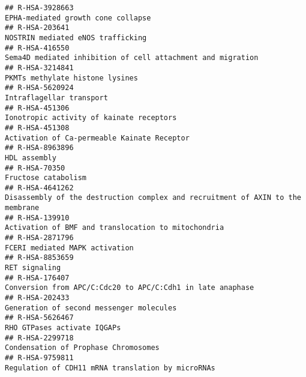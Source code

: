 \documentclass[
]{article}
\begin{document}
\begin{verbatim}
## R-HSA-3928663                                                                                                   EPHA-mediated growth cone collapse
## R-HSA-203641                                                                                                     NOSTRIN mediated eNOS trafficking
## R-HSA-416550                                                                           Sema4D mediated inhibition of cell attachment and migration
## R-HSA-3214841                                                                                                      PKMTs methylate histone lysines
## R-HSA-5620924                                                                                                             Intraflagellar transport
## R-HSA-451306                                                                                              Ionotropic activity of kainate receptors
## R-HSA-451308                                                                                           Activation of Ca-permeable Kainate Receptor
## R-HSA-8963896                                                                                                                         HDL assembly
## R-HSA-70350                                                                                                                    Fructose catabolism
## R-HSA-4641262                                                       Disassembly of the destruction complex and recruitment of AXIN to the membrane
## R-HSA-139910                                                                                   Activation of BMF and translocation to mitochondria
## R-HSA-2871796                                                                                                       FCERI mediated MAPK activation
## R-HSA-8853659                                                                                                                        RET signaling
## R-HSA-176407                                                                            Conversion from APC/C:Cdc20 to APC/C:Cdh1 in late anaphase
## R-HSA-202433                                                                                              Generation of second messenger molecules
## R-HSA-5626467                                                                                                          RHO GTPases activate IQGAPs
## R-HSA-2299718                                                                                                 Condensation of Prophase Chromosomes
## R-HSA-9759811                                                                                    Regulation of CDH11 mRNA translation by microRNAs

\end{verbatim}
\end{document}
